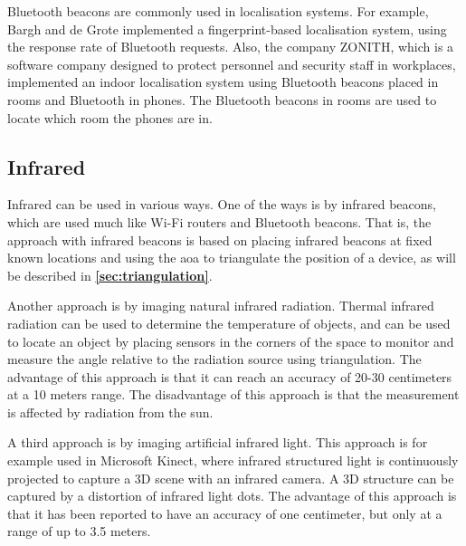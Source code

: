 Bluetooth beacons are commonly used in localisation systems. For example, Bargh and de Grote implemented a fingerprint-based localisation system, using the response rate of Bluetooth requests.\cite{HabilitationThesis} Also, the company ZONITH, which is a software company designed to protect personnel and security staff in workplaces\cite{zonith}, implemented an indoor localisation system using Bluetooth beacons placed in rooms and Bluetooth in phones. The Bluetooth beacons in rooms are used to locate which room the phones are in.\cite{HabilitationThesis}



\subsection{Infrared}
Infrared can be used in various ways. One of the ways is by infrared beacons, which are used much like Wi-Fi routers and Bluetooth beacons. That is, the approach with infrared beacons is based on placing infrared beacons at fixed known locations and using the \gls{aoa} to triangulate the position of a device, as will be described in \textbf{\autoref{sec:triangulation}}.\cite{HabilitationThesis}

Another approach is by imaging natural infrared radiation. Thermal infrared radiation can be used to determine the temperature of objects, and can be used to locate an object by placing sensors in the corners of the space to monitor and measure the angle relative to the radiation source using triangulation.
The advantage of this approach is that it can reach an accuracy of 20-30 centimeters at a 10 meters range.
The disadvantage of this approach is that the measurement is affected by radiation from the sun.\cite{HabilitationThesis}

A third approach is by imaging artificial infrared light. This approach is for example used in Microsoft Kinect, where infrared structured light is continuously projected to capture a 3D scene with an infrared camera. A 3D structure can be captured by a distortion of infrared light dots.
The advantage of this approach is that it has been reported to have an accuracy of one centimeter, but only at a range of up to 3.5 meters.\cite{HabilitationThesis}

